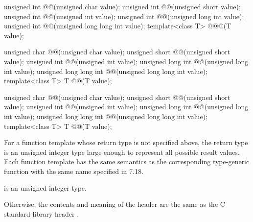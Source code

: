 \begin{codeblock}
unsigned int @@(unsigned char value);
unsigned int @@(unsigned short value);
unsigned int @@(unsigned int value);
unsigned int @@(unsigned long int value);
unsigned int @@(unsigned long long int value);
template<class T> @\seebelow@ @@(T value);

unsigned char @@(unsigned char value);
unsigned short @@(unsigned short value);
unsigned int @@(unsigned int value);
unsigned long int @@(unsigned long int value);
unsigned long long int @@(unsigned long long int value);
template<class T> T @@(T value);

unsigned char @@(unsigned char value);
unsigned short @@(unsigned short value);
unsigned int @@(unsigned int value);
unsigned long int @@(unsigned long int value);
unsigned long long int @@(unsigned long long int value);
template<class T> T @@(T value);
\end{codeblock}

\pnum
For a function template whose return type is not specified above,
the return type is
an  unsigned integer type
large enough to represent all possible result values.
Each function template has the same semantics
as the corresponding type-generic function with the same name
specified in \IsoC{} 7.18.

\pnum
\mandates
{} is an unsigned integer type.

\pnum
Otherwise,
the contents and meaning of the header  are the same as
the C standard library header .

